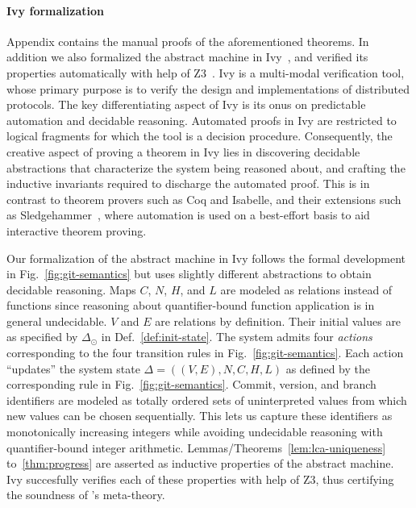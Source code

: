 \noindent\paragraph{Ivy formalization} Appendix contains the manual
proofs of the aforementioned theorems. In addition we also formalized
the \quark abstract machine in Ivy~\cite{ivy}, and verified its
properties automatically with help of Z3~\cite{z3}. Ivy is a
multi-modal verification tool, whose primary purpose is to verify the
design and implementations of distributed protocols. The key
differentiating aspect of Ivy is its onus on predictable automation
and decidable reasoning.  Automated proofs in Ivy are restricted to
logical fragments for which the tool is a decision procedure. %
Consequently, the creative aspect of proving a theorem in Ivy lies in
discovering decidable abstractions that characterize the system being
reasoned about, and crafting the inductive invariants required to
discharge the automated proof. This is in contrast to theorem provers
such as Coq and Isabelle, and their extensions such as
Sledgehammer~\cite{sledge}, where automation is used on a best-effort
basis to aid interactive theorem proving.

Our formalization of the \quark abstract machine in Ivy follows the
formal development in Fig.~\ref{fig:git-semantics} but uses slightly
different abstractions to obtain decidable reasoning. Maps $C$, $N$,
$H$, and $L$ are modeled as relations instead of functions since
reasoning about quantifier-bound function application is in general
undecidable. $V$ and $E$ are relations by definition. Their initial
values are as specified by $\Delta_{\odot}$ in
Def.~\ref{def:init-state}. The system admits four \emph{actions}
corresponding to the four transition rules in
Fig.~\ref{fig:git-semantics}. Each action ``updates'' the system state
$\Delta = ((V,E),N,C,H,L)$ as defined by the corresponding rule in
Fig.~\ref{fig:git-semantics}.
Commit, version, and branch identifiers are modeled as totally ordered
sets of uninterpreted values from which new values can be chosen
sequentially. This lets us capture these identifiers as monotonically
increasing integers while avoiding undecidable reasoning with
quantifier-bound integer arithmetic.
Lemmas/Theorems~\ref{lem:lca-uniqueness} to~\ref{thm:progress} are
asserted as inductive properties of the \quark abstract machine. Ivy
succesfully verifies each of these properties with help of Z3, thus
certifying the soundness of \quark's meta-theory.
